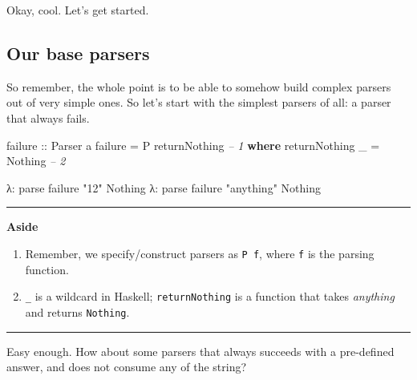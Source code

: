 \documentclass[]{article}
\newenvironment{Shaded}{}{}
\newcommand{\CommentTok}[1]{\textcolor[rgb]{0.38,0.63,0.69}{\textit{#1}}}
\newcommand{\DataTypeTok}[1]{\textcolor[rgb]{0.56,0.13,0.00}{#1}}
\newcommand{\FunctionTok}[1]{\textcolor[rgb]{0.02,0.16,0.49}{#1}}
\newcommand{\KeywordTok}[1]{\textcolor[rgb]{0.00,0.44,0.13}{\textbf{#1}}}
\newcommand{\NormalTok}[1]{#1}
\newcommand{\OtherTok}[1]{\textcolor[rgb]{0.00,0.44,0.13}{#1}}
\newcommand{\StringTok}[1]{\textcolor[rgb]{0.25,0.44,0.63}{#1}}
\begin{document}
Okay, cool. Let's get started.

\hypertarget{our-base-parsers}{%
\subsection{Our base parsers}\label{our-base-parsers}}

So remember, the whole point is to be able to somehow build complex parsers out
of very simple ones. So let's start with the simplest parsers of all: a parser
that always fails.

\begin{Shaded}
\begin{Highlighting}[]
\OtherTok{failure ::} \DataTypeTok{Parser}\NormalTok{ a}
\NormalTok{failure }\FunctionTok{=} \DataTypeTok{P}\NormalTok{ returnNothing                   }\CommentTok{-- 1}
    \KeywordTok{where}
\NormalTok{        returnNothing _ }\FunctionTok{=} \DataTypeTok{Nothing}           \CommentTok{-- 2}
\end{Highlighting}
\end{Shaded}

\begin{Shaded}
\begin{Highlighting}[]
\NormalTok{λ}\FunctionTok{:}\NormalTok{ parse failure }\StringTok{"12"}
\DataTypeTok{Nothing}
\NormalTok{λ}\FunctionTok{:}\NormalTok{ parse failure }\StringTok{"anything"}
\DataTypeTok{Nothing}
\end{Highlighting}
\end{Shaded}

\begin{center}\rule{0.5\linewidth}{\linethickness}\end{center}

\textbf{Aside}

\begin{enumerate}
\def\labelenumi{\arabic{enumi}.}
\tightlist
\item
  Remember, we specify/construct parsers as \texttt{P\ f}, where \texttt{f} is
  the parsing function.
\item
  \texttt{\_} is a wildcard in Haskell; \texttt{returnNothing} is a function
  that takes \emph{anything} and returns \texttt{Nothing}.
\end{enumerate}

\begin{center}\rule{0.5\linewidth}{\linethickness}\end{center}

Easy enough. How about some parsers that always succeeds with a pre-defined
answer, and does not consume any of the string?
\end{document}
